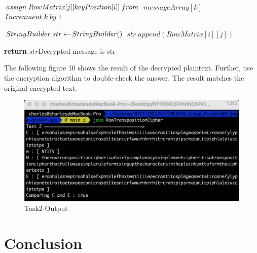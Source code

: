 \documentclass[twoside,twocolumn]{article}
\begin{document}
\begin{algorithm}
\begin{algorithmic}[1]
        	   \State $assign \hspace{0.1cm}  RowMatrix[j][keyPosition[i]] \hspace{0.1cm}  from$
        	   \State $messageArray[k]$
        	   \State \footnotesize $Increament\hspace{0.1cm} k\hspace{0.1cm} by \hspace{0.1cm}1$	
        	   \State \footnotesize$ $
		    \EndIf
        \EndFor  
      \EndFor  
               
      \State \footnotesize $ StringBuilder\hspace{0.1cm} str \gets StringBuilder()$
	  		\State $ str.append(RowMatrix[i][j]) $
		    \EndIf
        \EndFor  
      \EndFor  
      
      \State \textbf{return} $str$\Comment \tiny{Decrypted message is str}
    \EndFunction
  \end{algorithmic}
\end{algorithm}

The following figure 10 shows the result of the decrypted plaintext. Further, use the encryption algorithm to double-check the answer. The result matches the original encrypted text.

\begin{figure}[H]
  \centering
  \includegraphics[scale=0.35]{./Graphs/Figure2.0.png}
  \caption{Task2-Output}
  \label{fig:testfig1}
\end{figure}




\section{Conclusion}
\end{document}
